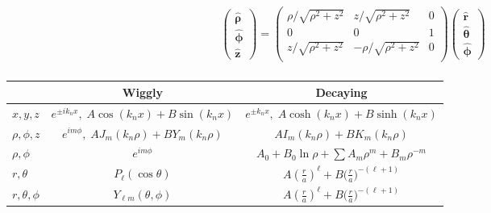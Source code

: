 \documentclass[10pt]{article}
\newcommand{\rhat}{\boldsymbol{\hat{\textbf{r}}}}
\newcommand{\zhat}{\boldsymbol{\hat{\textbf{z}}}}
\newcommand{\phihat}{\boldsymbol{\hat{\textbf{$\phi$}}}}
\newcommand{\thetahat}{\boldsymbol{\hat{\textbf{$\theta$}}}}
\newcommand{\rhohat}{\boldsymbol{\hat{\textbf{$\rho$}}}}
\begin{document}
\begin{multicols}{2}
\begin{align*}
 		\begin{pmatrix}
			\rhohat \\
			\phihat \\
			\zhat
 		\end{pmatrix} = 
 		\begin{pmatrix}
 			\rho / \sqrt{\rho^2 + z^2} & z / \sqrt{\rho^2 + z^2} & 0 \\
 			0 & 0 & 1 \\
 			z / \sqrt{\rho^2 + z^2} & - \rho /\sqrt{\rho^2 + z^2} & 0 \\
 		\end{pmatrix}
 		\begin{pmatrix}
			\rhat \\
			\thetahat \\
			\phihat
 		\end{pmatrix} \\
 	\end{align*}
	\renewcommand{\arraystretch}{2}
	\begin{tabular}{| l | c | c |} \hline
		& Wiggly & Decaying \\ \hline
		$x,y,z$ &$ e^{\pm i k_n x}, \; A \cos(k_n x) + B\sin(k_n x)$ & $e^{\pm k_n x}, \; A \cosh( k_n x) + B \sinh(k_n x)$ \\ \hline
		$\rho,\phi,z$ & $e^{i m \phi}, \; A J_m(k_n \rho) + B Y_m(k_n \rho)$ & $ A I_m(k_n \rho) + B K_m(k_n \rho)$ \\ \hline
		$\rho,\phi$ & $e^{i m \phi}$ & $A_0 + B_0 \ln \rho + \sum A_m \rho^m + B_m \rho^{-m}$ \\ \hline
		$r,\theta$ & $P_\ell(\cos \theta)$ & $A \left( \frac{r}{a} \right)^\ell + B \big( \frac{r}{a} \big)^{-(\ell+1)} $ \\ \hline
		$r, \theta, \phi$ & $Y_{\ell m}(\theta, \phi)$ &  $A \left( \frac{r}{a} \right)^\ell + B \big( \frac{r}{a} \big)^{-(\ell+1)} $ \\ \hline
	\end{tabular}
\end{multicols}
 
\end{document}
